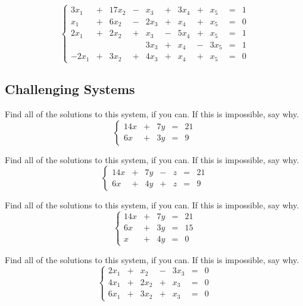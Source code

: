 \documentclass[cahier-main.tex]{subfiles}
\begin{document}
\begin{task}
\[
\left\{\begin{array}{rrrrrrrrrrr}
3x_1 & + & 17x_2 & - &  x_3 & + & 3x_4 & + &  x_5 & = & 1 \\
 x_1 & + &  6x_2 & - & 2x_3 & + &  x_4 & + &  x_5 & = & 0 \\
2x_1 & + &  2x_2 & + &  x_3 & - & 5x_4 & + &  x_5 & = & 1 \\ 
     &   &       &   & 3x_3 & + &  x_4 & - & 3x_5 & = & 1 \\
-2x_1& + &  3x_2 & + & 4x_3 & + &  x_4 & + &  x_5 & = & 0
\end{array}\right.
\]
\end{task}

\subsection{Challenging Systems}

\begin{task}
Find all of the solutions to this system, if you can. If this is impossible, say why.
\[
\left\{
\begin{array}{rrrrr}
14x & + & 7y & = & 21 \\
 6x & + & 3y & = & 9
\end{array}\right.
\]
\end{task}

\begin{task}
Find all of the solutions to this system, if you can. If this is impossible, say why.
\[
\left\{
\begin{array}{rrrrrrr}
14x & + & 7y & - & z & = & 21 \\
 6x & + & 4y & + & z & = & 9
\end{array}\right.
\]
\end{task}

\begin{task}
Find all of the solutions to this system, if you can. If this is impossible, say why.
\[
\left\{
\begin{array}{rrrrr}
14x & + & 7y & = & 21 \\
 6x & + & 3y & = & 15 \\
  x & + & 4y & = & 0
\end{array}\right.
\]

\end{task}

\begin{task}
Find all of the solutions to this system, if you can. If this is impossible, say why.
\[
\left\{
\begin{array}{rrrrrrr}
2x_1 & + &  x_2 & - & 3x_3 & = & 0 \\
4x_1 & + & 2x_2 & + &  x_3 & = & 0 \\
6x_1 & + & 3x_2 & + &  x_3 & = & 0
\end{array}
\right.
\]
\end{task}
\end{document}
